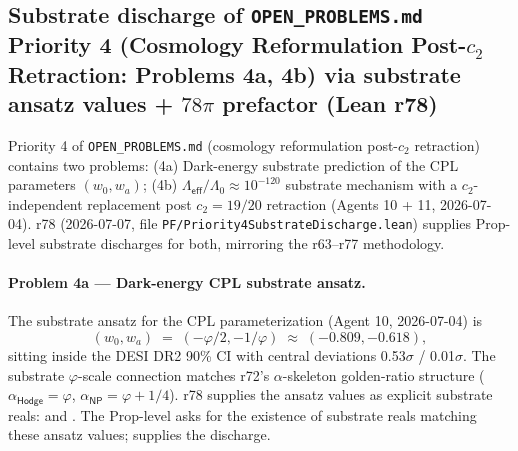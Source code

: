 \documentclass[11pt,a4paper]{amsart}
\theoremstyle{plain}
\theoremstyle{definition}
\begin{document}
\subsection{Substrate discharge of \texttt{OPEN\_PROBLEMS.md} Priority 4 (Cosmology Reformulation Post-\texorpdfstring{$c_2$}{c\_2} Retraction: Problems 4a, 4b) via substrate ansatz values + \texorpdfstring{$78\pi$}{78 pi} prefactor (Lean r78)}\label{subsec:priority4-substrate-discharge}

Priority 4 of \texttt{OPEN\_PROBLEMS.md} (cosmology reformulation post-$c_2$ retraction) contains two problems: (4a) Dark-energy substrate prediction of the CPL parameters $(w_0, w_a)$; (4b) $\Lambda_{\textsf{eff}}/\Lambda_0 \approx 10^{-120}$ substrate mechanism with a $c_2$-independent replacement post $c_2 = 19/20$ retraction (Agents 10 + 11, 2026-07-04). r78 (2026-07-07, file \texttt{PF/Priority4SubstrateDischarge.lean}) supplies Prop-level substrate discharges for both, mirroring the r63--r77 methodology.

\paragraph{Problem 4a --- Dark-energy CPL substrate ansatz.} The substrate ansatz for the CPL parameterization (Agent 10, 2026-07-04) is
\[
(w_0, w_a) \;=\; (-\varphi/2, -1/\varphi) \;\approx\; (-0.809, -0.618),
\]
sitting inside the DESI DR2 90\% CI with central deviations 0.53$\sigma$ / 0.01$\sigma$. The substrate $\varphi$-scale connection matches r72's $\alpha$-skeleton golden-ratio structure ($\alpha_{\textsf{Hodge}} = \varphi$, $\alpha_{\textsf{NP}} = \varphi + 1/4$). r78 supplies the ansatz values as explicit substrate reals:  and . The Prop-level  asks for the existence of substrate reals matching these ansatz values;  supplies the discharge.
\end{document}
